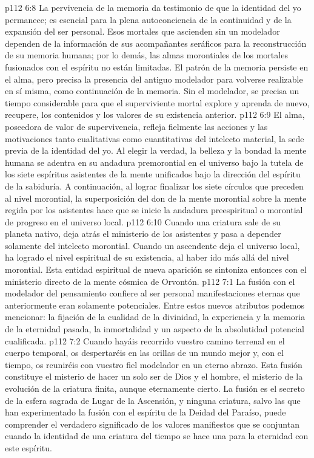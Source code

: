 \vs p112 6:8 La pervivencia de la memoria da testimonio de que la identidad del yo permanece; es esencial para la plena autoconciencia de la continuidad y de la expansión del ser personal. Esos mortales que ascienden sin un modelador dependen de la información de sus acompañantes seráficos para la reconstrucción de su memoria humana; por lo demás, las almas morontiales de los mortales fusionados con el espíritu no están limitadas. El patrón de la memoria persiste en el alma, pero precisa la presencia del antiguo modelador para volverse  realizable en sí misma, como continuación de la memoria. Sin el modelador, se precisa un tiempo considerable para que el superviviente mortal explore y aprenda de nuevo, recupere, los contenidos y los valores de su existencia anterior.
\vs p112 6:9 El alma, poseedora de valor de supervivencia, refleja fielmente las acciones y las motivaciones tanto cualitativas como cuantitativas del intelecto material, la sede previa de la identidad del yo. Al elegir la verdad, la belleza y la bondad la mente humana se adentra en su andadura premorontial en el universo bajo la tutela de los siete espíritus asistentes de la mente unificados bajo la dirección del espíritu de la sabiduría. A continuación, al lograr finalizar los siete círculos que preceden al nivel morontial, la superposición del don de la mente morontial sobre la mente regida por los asistentes hace que se inicie la andadura preespiritual o morontial de progreso en el universo local.
\vs p112 6:10 \pc Cuando una criatura sale de su planeta nativo, deja atrás el ministerio de los asistentes y pasa a depender solamente del intelecto morontial. Cuando un ascendente deja el universo local, ha logrado el nivel espiritual de su existencia, al haber ido más allá del nivel morontial. Esta entidad espiritual de nueva aparición se sintoniza entonces con el ministerio directo de la mente cósmica de Orvontón.
\vs p112 7:1 La fusión con el modelador del pensamiento confiere al ser personal manifestaciones eternas que anteriormente eran solamente potenciales. Entre estos nuevos atributos podemos mencionar: la fijación de la cualidad de la divinidad, la experiencia y la memoria de la eternidad pasada, la inmortalidad y un aspecto de la absolutidad potencial cualificada.
\vs p112 7:2 \pc Cuando hayáis recorrido vuestro camino terrenal en el cuerpo temporal, os despertaréis en las orillas de un mundo mejor y, con el tiempo, os reuniréis con vuestro fiel modelador en un eterno abrazo. Esta fusión constituye el misterio de hacer un solo ser de Dios y el hombre, el misterio de la evolución de la criatura finita, aunque eternamente cierto. La fusión es el secreto de la esfera sagrada de Lugar de la Ascensión, y ninguna criatura, salvo las que han experimentado la fusión con el espíritu de la Deidad del Paraíso, puede comprender el verdadero significado de los valores manifiestos que se conjuntan cuando la identidad de una criatura del tiempo se hace una para la eternidad con este espíritu.
